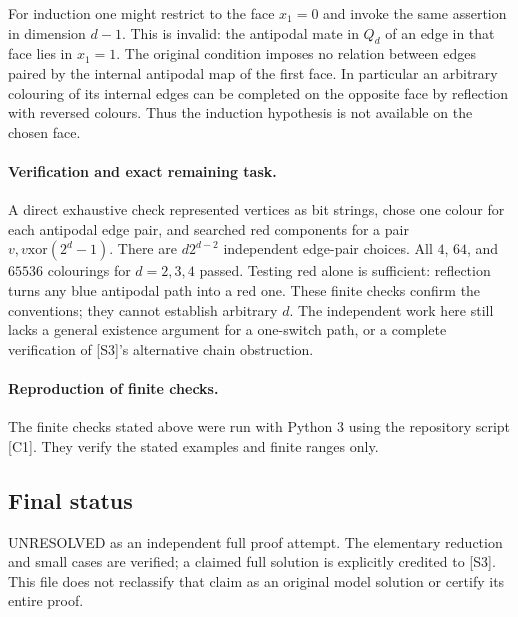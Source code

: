 \documentclass[11pt,a4paper]{article}
\begin{document}
For induction one might restrict to the face $x_1=0$ and invoke the
same assertion in dimension $d-1$. This is invalid: the antipodal
mate in $Q_d$ of an edge in that face lies in $x_1=1$. The original
condition imposes no relation between edges paired by the internal
antipodal map of the first face. In particular an arbitrary colouring
of its internal edges can be completed on the opposite face by
reflection with reversed colours. Thus the induction hypothesis is
not available on the chosen face.

\paragraph{Verification and exact remaining task.}
A direct exhaustive check represented vertices as bit strings, chose
one colour for each antipodal edge pair, and searched red components
for a pair $v,v\mathbin{\mathrm{xor}}(2^d-1)$. There are
$d2^{d-2}$ independent edge-pair choices. All $4$, $64$, and $65536$
colourings for $d=2,3,4$ passed. Testing red alone is sufficient:
reflection turns any blue antipodal path into a red one. These finite
checks confirm the conventions; they cannot establish arbitrary $d$.
The independent work here still lacks a general existence argument
for a one-switch path, or a complete verification of [S3]'s alternative
chain obstruction.

\paragraph{Reproduction of finite checks.}
The finite checks stated above were run with Python 3 using the repository
script [C1]. They verify the stated examples and finite ranges only.

\subsection{Final status}
UNRESOLVED as an independent full proof attempt. The elementary
reduction and small cases are verified; a claimed full solution is
explicitly credited to [S3]. This file does not reclassify that claim
as an original model solution or certify its entire proof.
\end{document}

